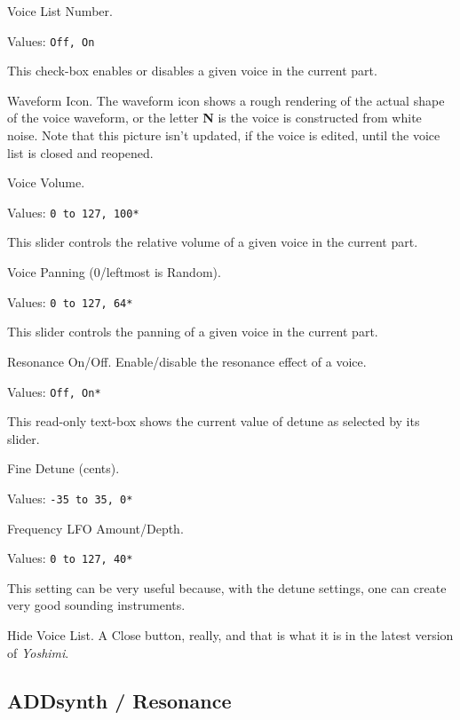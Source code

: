    \setcounter{ItemCounter}{0}      %

   Voice List Number.

   Values: \texttt{Off, On}

   This check-box enables or disables a given voice in the current part.

   Waveform Icon.
   The waveform icon shows a rough rendering of the actual shape of the
   voice waveform, or the letter \textbf{N} is the voice is constructed from
   white noise.  Note that this picture isn't updated, if the voice is
   edited, until the voice list is closed and reopened.

   Voice Volume.

   Values: \texttt{0 to 127, 100*}

   This slider controls the relative volume of a given voice in the current
   part.

   Voice Panning (0/leftmost is Random).

   Values: \texttt{0 to 127, 64*}

   This slider controls the panning of a given voice in the current part.

   Resonance On/Off.
   Enable/disable the resonance effect of a voice.

   Values: \texttt{Off, On*}

   This read-only text-box shows the current value of detune as selected by
   its slider.

   Fine Detune (cents).

   Values: \texttt{-35 to 35, 0*}

   Frequency LFO Amount/Depth.

   Values: \texttt{0 to 127, 40*}

   This setting can be very useful because, with the detune settings, one can
   create very good sounding instruments. 

   Hide Voice List.  A Close button, really, and that is what it is in the
   latest version of \textsl{Yoshimi}.

\subsection{ADDsynth / Resonance}
\label{subsec:addsynth_resonance}

